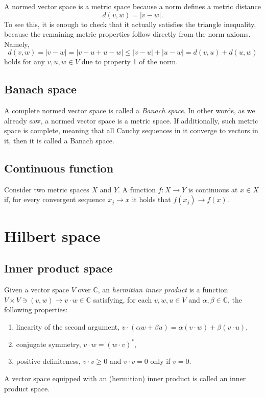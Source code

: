 \documentclass[aps,prl,twocolumn,groupedaddress]{revtex4-2}
\newcommand{\CC}{\mathbb{C}}
\begin{document}
A normed vector space is a metric space because a norm defines a metric distance
$$
d(v,w) = |v-w|.
$$
To see this, it is enough to check that it actually satisfies the triangle inequality, because the remaining metric properties follow directly from the norm axioms.
Namely,
$$
d(v,w) = |v-w| = |v-u+u-w| \leq |v-u|+|u-w| = d(v,u) + d(u,w)
$$
holds for any $v,u,w\in V$ due to property 1 of the norm.

\subsection{Banach space}

A complete normed vector space is called a {\em Banach space}.
In other words, as we already saw, a normed vector space is a metric space.
If additionally, such metric space is complete, meaning that all Cauchy sequences in it converge to vectors in it, then it is called a Banach space.

\subsection{Continuous function}

Consider two metric spaces $X$ and $Y$.
A function $f:X\to Y$ is continuous at $x\in X$ if, for every convergent sequence $x_j \to x$ it holds that $f(x_j)\to f(x)$.

\section{Hilbert space}

\subsection{Inner product space}

Given a vector space $V$ over $\CC$, an {\em hermitian inner product} is a function $V\times V\ni (v,w) \to v\cdot w \in \CC$ satisfying, for each $v,w,u\in V$ and $\alpha,\beta\in \CC$, the following properties:
\begin{enumerate}
\item linearity of the second argument, $v\cdot(\alpha w+\beta u) = \alpha (v\cdot w) + \beta (v\cdot u)$,
\item conjugate symmetry, $v\cdot w = (w\cdot v)^*$,
\item positive definiteness, $v\cdot v\geq 0$ and $v\cdot v=0$ only if $v=0$.
\end{enumerate}
A vector space equipped with an (hermitian) inner product is called an inner product space.
\end{document}
